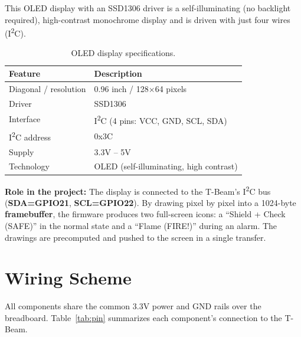 \documentclass[11pt,a4paper]{article}
\begin{document}
This OLED display with an SSD1306 driver is a self-illuminating (no backlight required),
high-contrast monochrome display and is driven with just four wires (I\textsuperscript{2}C).

\begin{table}[H]
\centering
\caption{OLED display specifications.}
\begin{tabular}{L{4.2cm} L{9.5cm}}
\toprule
\textbf{Feature} & \textbf{Description}\\
\midrule
Diagonal / resolution & 0.96 inch / 128$\times$64 pixels\\
Driver               & SSD1306\\
Interface            & I\textsuperscript{2}C (4 pins: VCC, GND, SCL, SDA)\\
I\textsuperscript{2}C address & 0x3C\\
Supply               & 3.3V -- 5V\\
Technology           & OLED (self-illuminating, high contrast)\\
\bottomrule
\end{tabular}
\end{table}

\noindent\textbf{Role in the project:} The display is connected to the T-Beam's
I\textsuperscript{2}C bus (\textbf{SDA=GPIO21}, \textbf{SCL=GPIO22}). By drawing pixel by
pixel into a 1024-byte \textbf{framebuffer}, the firmware produces two full-screen icons: a
``Shield + Check (SAFE)'' in the normal state and a ``Flame (FIRE!)'' during an alarm. The
drawings are precomputed and pushed to the screen in a single transfer.

\section{Wiring Scheme}

All components share the common 3.3V power and GND rails over the breadboard.
Table~\ref{tab:pin} summarizes each component's connection to the T-Beam.
\end{document}
